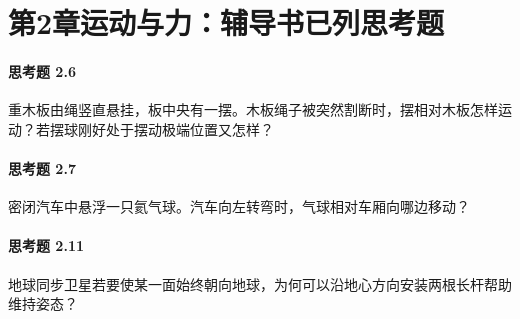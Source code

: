 \section*{第2章\quad 运动与力：辅导书已列思考题}
\paragraph{思考题 2.6}
重木板由绳竖直悬挂，板中央有一摆。木板绳子被突然割断时，摆相对木板怎样运动？若摆球刚好处于摆动极端位置又怎样？

\paragraph{思考题 2.7}
密闭汽车中悬浮一只氦气球。汽车向左转弯时，气球相对车厢向哪边移动？

\paragraph{思考题 2.11}
地球同步卫星若要使某一面始终朝向地球，为何可以沿地心方向安装两根长杆帮助维持姿态？

